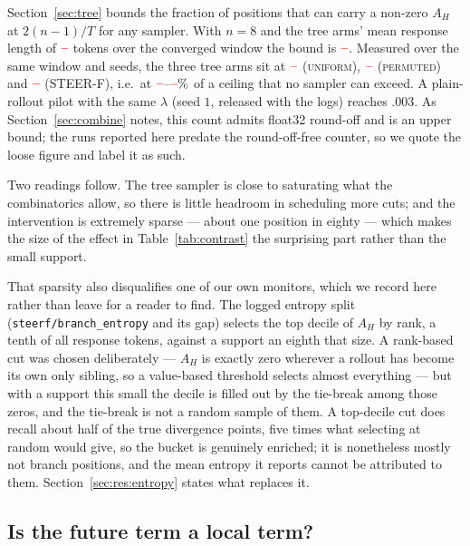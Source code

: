 \documentclass[11pt]{article}
\newcommand{\AH}{A_{H}}
\providecommand{\PENDING}{\textcolor{red}{\textbf{--}}}
\newcommand{\num}[1]{\ifcsname #1\endcsname\csname #1\endcsname\else\PENDING\fi}
\begin{document}
Section~\ref{sec:tree} bounds the fraction of positions that can carry a non-zero
$\AH$ at $2(n-1)/T$ for any sampler. With $n = 8$ and the tree arms' mean response
length of $\num{Treelen}$ tokens over the converged window the bound is
$\num{Supportbound}$. Measured over the same window and seeds, the three tree arms
sit at $\num{Runiformbranchfrac}$ (\textsc{uniform}), $\num{Rpermutedbranchfrac}$
(\textsc{permuted}) and $\num{Rsignedbranchfrac}$ (STEER-F), i.e.\ at
$\num{Supportpctlo}$--$\num{Supportpcthi}\%$ of a ceiling that no sampler can
exceed. A plain-rollout pilot with the same $\lambda$ (seed $1$, released with the
logs) reaches $.003$. As Section~\ref{sec:combine} notes, this
count admits float32 round-off and is an upper bound; the runs reported here predate
the round-off-free counter, so we quote the loose figure and label it as such.

Two readings follow. The tree sampler is close to saturating what the combinatorics
allow, so there is little headroom in scheduling more cuts; and the intervention is
extremely sparse --- about one position in eighty --- which makes the size of the
effect in Table~\ref{tab:contrast} the surprising part rather than the small support.

That sparsity also disqualifies one of our own monitors, which we record here rather
than leave for a reader to find. The logged entropy split
(\texttt{steerf/branch\_entropy} and its gap) selects the top decile of $\AH$ by
rank, a tenth of all response tokens, against a support an eighth that size. A
rank-based cut was chosen deliberately --- $\AH$ is exactly zero wherever a rollout
has become its own only sibling, so a value-based threshold selects almost
everything --- but with a support this small the decile is filled out by the
tie-break among those zeros, and the tie-break is not a random sample of them.
A top-decile cut does recall about half of the true divergence points, five times
what selecting at random would give, so the bucket is genuinely enriched; it is
nonetheless mostly not branch positions, and the mean entropy it reports cannot be
attributed to them. Section~\ref{sec:res:entropy} states what replaces it.

\subsection{Is the future term a local term?}
\label{sec:res:locality}
\end{document}
